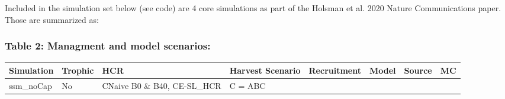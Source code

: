 \documentclass[]{article}
\begin{document}
Included in the simulation set below (see code) are 4 core simulations
as part of the Holsman et al. 2020 Nature Communications paper. Those
are summarized as:

\subsubsection{Table 2: Managment and model
scenarios:}\label{table-2-managment-and-model-scenarios}

\begin{longtable}[]{@{}llllllll@{}}
\toprule
\begin{minipage}[b]{0.16\columnwidth}\raggedright\strut
Simulation\strut
\end{minipage} & \begin{minipage}[b]{0.06\columnwidth}\raggedright\strut
Trophic\strut
\end{minipage} & \begin{minipage}[b]{0.13\columnwidth}\raggedright\strut
HCR\strut
\end{minipage} & \begin{minipage}[b]{0.10\columnwidth}\raggedright\strut
Harvest Scenario\strut
\end{minipage} & \begin{minipage}[b]{0.11\columnwidth}\raggedright\strut
Recruitment\strut
\end{minipage} & \begin{minipage}[b]{0.10\columnwidth}\raggedright\strut
Model\strut
\end{minipage} & \begin{minipage}[b]{0.08\columnwidth}\raggedright\strut
Source\strut
\end{minipage} & \begin{minipage}[b]{0.05\columnwidth}\raggedright\strut
MC\strut
\end{minipage}\tabularnewline
\midrule
\endhead
\begin{minipage}[t]{0.16\columnwidth}\raggedright\strut
ssm\_noCap\strut
\end{minipage} & \begin{minipage}[t]{0.06\columnwidth}\raggedright\strut
No\strut
\end{minipage} & \begin{minipage}[t]{0.13\columnwidth}\raggedright\strut
CNaive B0 \& B40, CE-SL\_HCR\strut
\end{minipage} & \begin{minipage}[t]{0.10\columnwidth}\raggedright\strut
C = ABC\strut
\end{minipage} & \begin{minipage}[t]{0.11\columnwidth}\raggedright\strut

\end{minipage}
\end{longtable}
\end{document}
